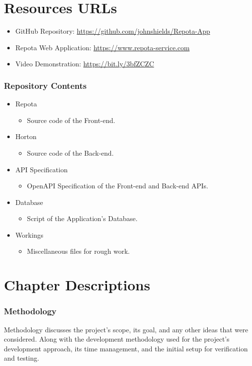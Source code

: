 \newpage
\section{Resources URLs}
\begin{itemize}
    \item GitHub Repository: 
    \url{https://github.com/johnshields/Repota-App}
    \item Repota Web Application: 
    \url{https://www.repota-service.com}
    \item Video Demonstration: 
    \url{https://bit.ly/3bfZCZC}
\end{itemize}

\subsubsection{Repository Contents}
\begin{itemize}
  \item Repota
    \begin{itemize}
    \item Source code of the Front-end.
    \end{itemize}
  \item Horton
    \begin{itemize}
    \item Source code of the Back-end.
    \end{itemize}
  \item API Specification
    \begin{itemize}
    \item OpenAPI Specification of the Front-end and Back-end APIs.
    \end{itemize}
  \item Database
    \begin{itemize}
    \item Script of the Application's Database.
    \end{itemize}
  \item Workings
    \begin{itemize}
    \item Miscellaneous files for rough work. 
    \end{itemize}
\end{itemize}

\newpage
\section{Chapter Descriptions}
\subsubsection{Methodology}
Methodology discusses the project's scope, its goal, and any other ideas that were considered. Along with the development methodology used for the project's development approach, its time management, and the initial setup for verification and testing.

